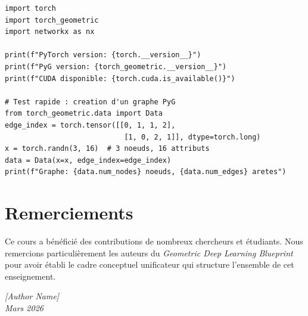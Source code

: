 \begin{codeblock}[title=\textbf{V\'erification de l'environnement}]
\begin{verbatim}
import torch
import torch_geometric
import networkx as nx

print(f"PyTorch version: {torch.__version__}")
print(f"PyG version: {torch_geometric.__version__}")
print(f"CUDA disponible: {torch.cuda.is_available()}")

# Test rapide : creation d'un graphe PyG
from torch_geometric.data import Data
edge_index = torch.tensor([[0, 1, 1, 2],
                            [1, 0, 2, 1]], dtype=torch.long)
x = torch.randn(3, 16)  # 3 noeuds, 16 attributs
data = Data(x=x, edge_index=edge_index)
print(f"Graphe: {data.num_nodes} noeuds, {data.num_edges} aretes")
\end{verbatim}
\end{codeblock}

\section*{Remerciements}

Ce cours a b\'en\'efici\'e des contributions de nombreux chercheurs et \'etudiants.
Nous remercions particuli\`erement les auteurs du \textit{Geometric Deep Learning
Blueprint} pour avoir \'etabli le cadre conceptuel unificateur qui structure
l'ensemble de cet enseignement.

\vspace{1cm}
\begin{flushright}
\textit{[Author Name]} \\
\textit{Mars 2026}
\end{flushright}
